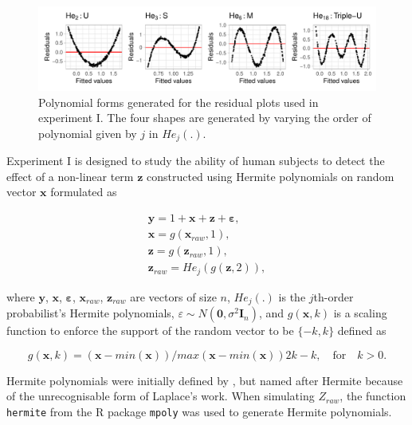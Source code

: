 \documentclass[]{interact}
\theoremstyle{plain}%
\theoremstyle{definition}
\theoremstyle{remark}
\begin{document}
\begin{figure}

{\centering \includegraphics[width=1\linewidth]{paper_comparison_files/figure-latex/different-shape-of-herimite-1} 

}

\caption{Polynomial forms generated for the residual plots used in experiment I. The four shapes are generated by varying the order of polynomial given by $j$ in $He_j(.)$.}\label{fig:different-shape-of-herimite}
\end{figure}

Experiment I is designed to study the ability of human subjects to
detect the effect of a non-linear term \(\boldsymbol{z}\) constructed
using Hermite polynomials \citep{hermite1864nouveau} on random vector
\(\boldsymbol{x}\) formulated as

\begin{align} \label{eq:nonlinearity-model}
\boldsymbol{y} = 1 + \boldsymbol{x} + \boldsymbol{z} + \boldsymbol{\varepsilon},\\
\boldsymbol{x} = g(\boldsymbol{x}_{raw}, 1), \\
\boldsymbol{z} = g(\boldsymbol{z}_{raw}, 1), \\
\boldsymbol{z}_{raw} = He_j(g(\boldsymbol{z}, 2)),
\end{align}

\noindent where \(\boldsymbol{y}\), \(\boldsymbol{x}\),
\(\boldsymbol{\varepsilon}\), \(\boldsymbol{x}_{raw}\),
\(\boldsymbol{z}_{raw}\) are vectors of size \(n\), \(He_{j}(.)\) is the
\(j\)th-order probabilist's Hermite polynomials,
\(\varepsilon \sim N(\boldsymbol{0}, \sigma^2\boldsymbol{I}_n)\), and
\(g(\boldsymbol{x}, k)\) is a scaling function to enforce the support of
the random vector to be \(\{-k, k\}\) defined as

\begin{equation} \label{eq:scaling-function}
g(\boldsymbol{x}, k) = (\boldsymbol{x} - min(\boldsymbol{x}))/max(\boldsymbol{x} - min(\boldsymbol{x}))2k - k, \quad \text{for} \quad k > 0. 
\end{equation}

Hermite polynomials were initially defined by \citet{de1820theorie}, but
named after Hermite \citep{hermite1864nouveau} because of the
unrecognisable form of Laplace's work. When simulating \(Z_{raw}\), the
function \texttt{hermite} from the R package \texttt{mpoly}
\citep{mpoly} was used to generate Hermite polynomials.
\end{document}
